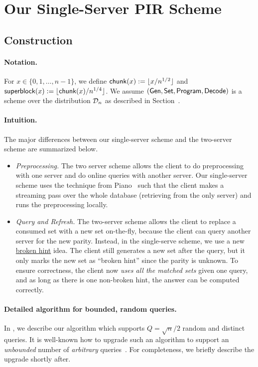 \section{Our Single-Server PIR Scheme}\label{sec:one-server}


\subsection{Construction}

\paragraph{Notation.} For $x\in \{0,1,\ldots,n-1\}$, we define $\mathsf{chunk}(x):=\lfloor x/n^{1/2} \rfloor$ and $\mathsf{superblock}(x):=\lfloor \mathsf{chunk}(x)/n^{1/4} \rfloor$. We assume $(\mathsf{Gen},\mathsf{Set},\mathsf{Program},\mathsf{Decode})$ is a \ppps scheme over the distribution $\mathcal{D}_n$ as described in Section~.

\paragraph{Intuition.} The major differences between our single-server scheme and the two-server scheme are summarized below.

\begin{itemize}[leftmargin=*]
    \item \textit{Preprocessing.} The two server scheme allows the client to do preprocessing with one server and do online queries with another server. 
    Our single-server scheme uses the technique from Piano~\cite{piano} such that the client makes a streaming pass over the whole database (retrieving from the only server) and runs the preprocessing locally. 
    
    \item \textit{Query and Refresh.}
    The two-server scheme allows the client to replace a consumed set with a new set on-the-fly, because the client can query another server for the new parity.
    Instead, in the single-serve scheme, we use a new \underline{broken hint} idea. 
    The client still generates a new set after the query, but it only marks the new set as ``broken hint'' since the parity is unknown. 
    To ensure correctness, the client now  \textit{uses all the matched sets} given one query, and as long as there is one non-broken hint, the answer can be computed correctly.
\end{itemize}


\paragraph{Detailed algorithm for bounded, random queries.}
In , we describe
our algorithm which supports  
$Q = \sqrt{n}/2$ random and distinct queries.
It is well-known how to upgrade such an algorithm
to support an {\it unbounded} number of 
{\it arbitrary} queries~\cite{pir-ec23}.
For completeness, we briefly describe the upgrade shortly after.

